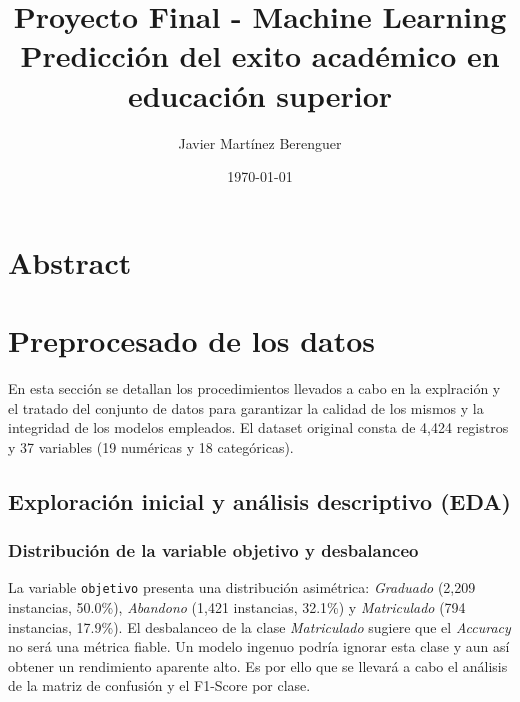 \documentclass{article}
\title{\textbf{Proyecto Final - Machine Learning} \\[0.5em] \Large Predicción del exito académico en educación superior}
\author{Javier Martínez Berenguer}
\date{\today}
\begin{document}
\maketitle

\section{Abstract}


\section{Preprocesado de los datos}

En esta sección se detallan los procedimientos llevados a cabo en la explración y el 
tratado del conjunto de datos para garantizar 
la calidad de los mismos y la integridad de los modelos empleados. 
El dataset original consta de 4,424 registros y 37 variables (19 numéricas y 18 categóricas).

\subsection{Exploración inicial y análisis descriptivo (EDA)}

\subsubsection{Distribución de la variable objetivo y desbalanceo}
La variable \texttt{objetivo} presenta una distribución asimétrica: \textit{Graduado} (2,209 instancias, 50.0\%), \textit{Abandono} (1,421 instancias, 32.1\%) y \textit{Matriculado} (794 instancias, 17.9\%). 
El desbalanceo de la clase \textit{Matriculado} 
    sugiere que el \textit{Accuracy} no será una métrica fiable. Un modelo ingenuo podría ignorar esta 
    clase y aun así obtener un rendimiento aparente alto. Es por ello que se llevará a cabo el análisis de la matriz de 
    confusión y el F1-Score por clase.
\end{document}
